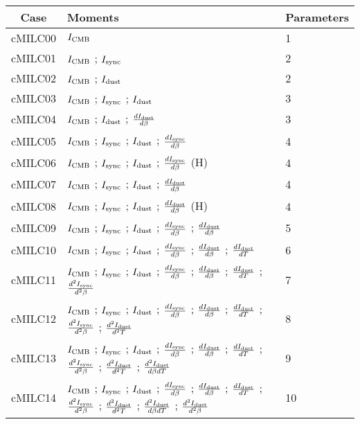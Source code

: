 \begin{tabular}{cll}
\toprule
    Case &                                                                                                                                                                                                                                                                                                         Moments &  Parameters \\
\midrule
 cMILC00 &  $I_{\rm CMB}$ &  1 \\
 cMILC01 &  $I_{\rm CMB}$ ; $I_{\rm sync}$ &  2 \\
 cMILC02 &  $I_{\rm CMB}$ ; $I_{\rm dust}$ &  2 \\
 cMILC03 &  $I_{\rm CMB}$ ; $I_{\rm sync}$ ; $I_{\rm dust}$ &  3 \\
 cMILC04 &  $I_{\rm CMB}$ ; $I_{\rm dust}$ ; $\frac{d I_{\rm dust}}{d \beta}$ &  3 \\
 cMILC05 &  $I_{\rm CMB}$ ; $I_{\rm sync}$ ; $I_{\rm dust}$ ; $\frac{d I_{\rm sync}}{d \beta}$ &  4 \\
 cMILC06 &  $I_{\rm CMB}$ ; $I_{\rm sync}$ ; $I_{\rm dust}$ ; $\frac{d I_{\rm sync}}{d \beta}$ (H) &  4 \\
 cMILC07 &  $I_{\rm CMB}$ ; $I_{\rm sync}$ ; $I_{\rm dust}$ ; $\frac{d I_{\rm dust}}{d \beta}$ &  4 \\
 cMILC08 &  $I_{\rm CMB}$ ; $I_{\rm sync}$ ; $I_{\rm dust}$ ; $\frac{d I_{\rm dust}}{d \beta}$ (H) &  4 \\
 cMILC09 &  $I_{\rm CMB}$ ; $I_{\rm sync}$ ; $I_{\rm dust}$ ; $\frac{d I_{\rm sync}}{d \beta}$ ; $\frac{d I_{\rm dust}}{d \beta}$ &  5 \\
 cMILC10 &  $I_{\rm CMB}$ ; $I_{\rm sync}$ ; $I_{\rm dust}$ ; $\frac{d I_{\rm sync}}{d \beta}$ ; $\frac{d I_{\rm dust}}{d \beta}$ ; $\frac{d I_{\rm dust}}{d T}$ &  6 \\
 cMILC11 &  $I_{\rm CMB}$ ; $I_{\rm sync}$ ; $I_{\rm dust}$ ; $\frac{d I_{\rm sync}}{d \beta}$ ; $\frac{d I_{\rm dust}}{d \beta}$ ; $\frac{d I_{\rm dust}}{d T}$ ; $\frac{d^2 I_{\rm sync}}{d^2 \beta}$ &  7 \\
 cMILC12 &  $I_{\rm CMB}$ ; $I_{\rm sync}$ ; $I_{\rm dust}$ ; $\frac{d I_{\rm sync}}{d \beta}$ ; $\frac{d I_{\rm dust}}{d \beta}$ ; $\frac{d I_{\rm dust}}{d T}$ ; $\frac{d^2 I_{\rm sync}}{d^2 \beta}$ ; $\frac{d^2 I_{\rm dust}}{d^2 T}$ &  8 \\
 cMILC13 &  $I_{\rm CMB}$ ; $I_{\rm sync}$ ; $I_{\rm dust}$ ; $\frac{d I_{\rm sync}}{d \beta}$ ; $\frac{d I_{\rm dust}}{d \beta}$ ; $\frac{d I_{\rm dust}}{d T}$ ; $\frac{d^2 I_{\rm sync}}{d^2 \beta}$ ; $\frac{d^2 I_{\rm dust}}{d^2 T}$ ; $\frac{d^2 I_{\rm dust}}{d \beta d T}$ &  9 \\
 cMILC14 &  $I_{\rm CMB}$ ; $I_{\rm sync}$ ; $I_{\rm dust}$ ; $\frac{d I_{\rm sync}}{d \beta}$ ; $\frac{d I_{\rm dust}}{d \beta}$ ; $\frac{d I_{\rm dust}}{d T}$ ; $\frac{d^2 I_{\rm sync}}{d^2 \beta}$ ; $\frac{d^2 I_{\rm dust}}{d^2 T}$ ; $\frac{d^2 I_{\rm dust}}{d \beta d T}$ ; $\frac{d^2 I_{\rm dust}}{d^2 \beta}$ &  10 \\
\bottomrule
\end{tabular}
